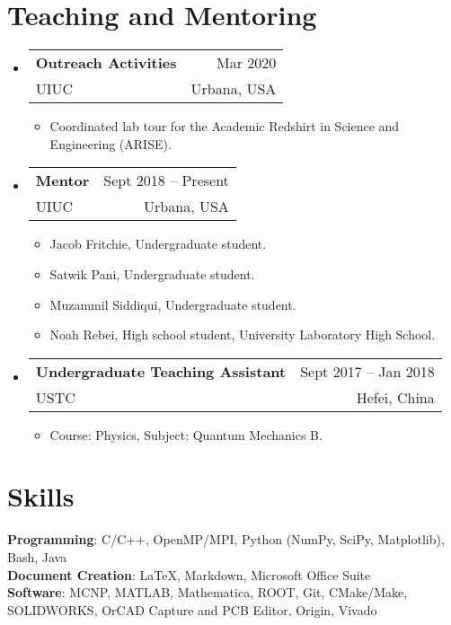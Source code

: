 \documentclass[letterpaper,11pt]{article} %
\makeatletter
\newcommand{\CVItem}[1]{
  \item\small{
    {#1 \vspace{-2pt}}
  }
}
\newcommand{\CVSubheading}[4]{
  \vspace{-2pt}\item
    \begin{tabular*}{0.97\textwidth}[t]{l@{\extracolsep{\fill}}r}
      \textbf{#1} & #2 \\
      \small#3 & \small #4 \\
    \end{tabular*}\vspace{-7pt}
}
\newcommand{\CVSubHeadingListStart}{\begin{itemize}[leftmargin=0.5cm, label={}]}
\newcommand{\CVSubHeadingListEnd}{\end{itemize}}
\newcommand{\CVItemListStart}{\begin{itemize}}
\newcommand{\CVItemListEnd}{\end{itemize}\vspace{-5pt}}
\makeatother
\begin{document}
\section{Teaching and Mentoring}
\CVSubHeadingListStart
    \CVSubheading
      {Outreach Activities}{Mar 2020}
      {UIUC}{Urbana, USA}
      \CVItemListStart
        \CVItem{Coordinated lab tour for the Academic Redshirt in Science and Engineering (ARISE).}
      \CVItemListEnd
    \CVSubheading
      {Mentor}{Sept 2018 – Present}
      {UIUC}{Urbana, USA}
      \CVItemListStart
        \CVItem{Jacob Fritchie, Undergraduate student.}
        \CVItem{Satwik Pani, Undergraduate student.}
        \CVItem{Muzammil Siddiqui, Undergraduate student.}
        \CVItem{Noah Rebei, High school student, University Laboratory High School.}
      \CVItemListEnd
    \CVSubheading
      {Undergraduate Teaching Assistant}{Sept 2017 – Jan 2018}
      {USTC}{Hefei, China}
      \CVItemListStart
        \CVItem{Course: Physics, Subject: Quantum Mechanics B.}
      \CVItemListEnd
  \CVSubHeadingListEnd

\begin{comment}
This section is compressed from the various skills sections that Euro CV
recommends.
\end{comment}

\section{Skills}
 \begin{itemize}[leftmargin=0.5cm, label={}]
    {\item{
     \textbf{Programming}{: C/C++, OpenMP/MPI, Python (NumPy, SciPy, Matplotlib), Bash, Java} \\
     \textbf{Document Creation}{: \LaTeX, Markdown, Microsoft Office Suite} \\
     \textbf{Software}{: MCNP, MATLAB, Mathematica, ROOT, Git, CMake/Make, SOLIDWORKS, OrCAD Capture and PCB Editor, Origin, Vivado}\\
    }}
 \end{itemize}


\end{document}
